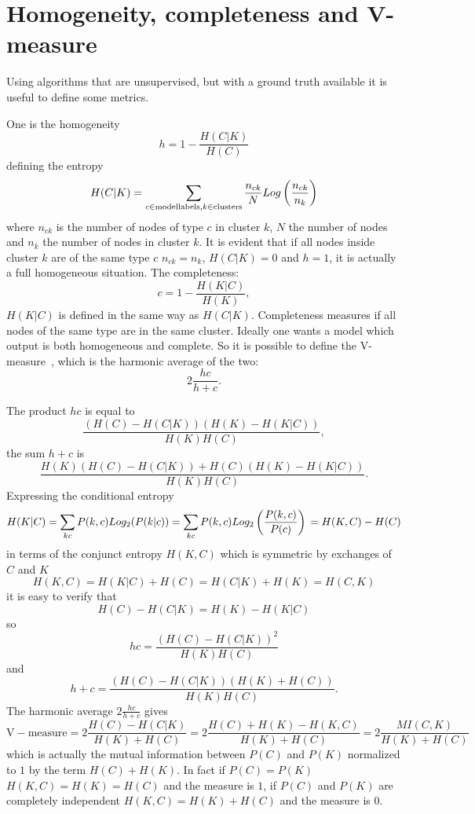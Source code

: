 \chapter{Homogeneity, completeness and V-measure}\label{app:vmeasure}
Using algorithms that are unsupervised, but with a ground truth available it is useful to define some metrics.

One is the homogeneity
\begin{equation}
    h=1-\frac{H(C|K)}{H(C)}
\end{equation}
defining the entropy
\begin{equation}
    H(C|K)=\sum_{c\in \mathrm{model labels},\\ k \in \mathrm{clusters}}\frac{n_{c k}}{N}Log\left(\frac{n_{c k}}{n_k}\right)
\end{equation}
where $n_{c k}$ is the number of nodes of type $c$ in cluster $k$, $N$ the number of nodes and $n_k$ the number of nodes in cluster $k$. It is evident that if all nodes inside cluster $k$ are of the same type $c$ $n_{c k}=n_{k}$, $H(C|K)=0$ and $h=1$, it is actually a full homogeneous situation.
The completeness:
\begin{equation}
    c=1-\frac{H(K|C)}{H(K)},
\end{equation}
$H(K|C)$ is defined in the same way as $H(C|K)$. Completeness measures if all nodes of the same type are in the same cluster.
Ideally one wants a model which output is both homogeneous and complete. So it is possible to define the V-measure~\cite{rosenberg2007v}, which is the harmonic average of the two:
\begin{equation}
    2\frac{h c}{h + c}.
\end{equation}

The product $h c$ is equal to
\begin{equation}
    \frac{(H(C)-H(C|K))(H(K)-H(K|C))}{H(K) H(C)},
\end{equation}
the sum $h + c$ is
\begin{equation}
    \frac{H(K)(H(C)-H(C|K))+H(C)(H(K)-H(K|C))}{H(K) H(C)}.
\end{equation}
Expressing the conditional entropy 
\[
H(K|C)=\sum_{k c} P(k,c)Log_2(P(k|c))
\\=\sum_{k c} P(k,c)Log_2\left(\frac{P(k,c)}{P(c)}\right)
\\=H(K,C) - H(C)
\]
in terms of the conjunct entropy $H(K,C)$ which is symmetric by exchanges of $C$ and $K$
\[
H(K,C)=H(K|C) + H(C) = H(C|K) + H(K) = H(C,K)
\]
it is easy to verify that 
\[
H(C) - H(C|K) = H(K) - H(K|C) 
\]
so
\[
h c = \frac{(H(C)-H(C|K))^2}{H(K) H(C)}
\]
and
\[
h + c = \frac{(H(C)-H(C|K))(H(K)+H(C))}{H(K) H(C)}.
\]
The harmonic average $2\frac{h c}{h + c}$ gives
\[
\mathrm{V-measure}=2\frac{H(C)-H(C|K)}{H(K)+H(C)}=2\frac{H(C)+H(K)-H(K,C)}{H(K)+H(C)}=2\frac{MI(C,K)}{H(K)+H(C)}
\]
which is actually the mutual information between $P(C)$ and $P(K)$ normalized to $1$ by the term $H(C)+H(K)$. In fact if $P(C)=P(K)$ $H(K,C)=H(K)=H(C)$ and the measure is $1$, if $P(C)$ and $P(K)$ are completely independent $H(K,C)=H(K)+H(C)$ and the measure is $0$.
